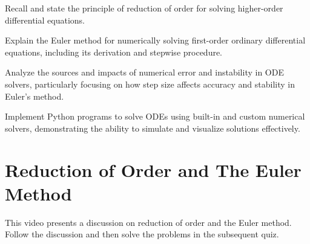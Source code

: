 \begin{mlos}
 \item Recall and state the principle of reduction of order for solving higher-order differential equations.
  \item Explain the Euler method for numerically solving first-order ordinary differential equations, including its derivation and stepwise procedure.
  \item Analyze the sources and impacts of numerical error and instability in ODE solvers, particularly focusing on how step size affects accuracy and stability in Euler’s method.
  \item Implement Python programs to solve ODEs using built-in and custom numerical solvers, demonstrating the ability to simulate and visualize solutions effectively.
\end{mlos}

\section{Reduction of Order and The Euler Method}
\videolesson
\begin{selfvideo}[1]
This video presents a discussion on reduction of order and the Euler method. Follow the discussion and then solve the problems in the subsequent quiz.
\end{selfvideo}
